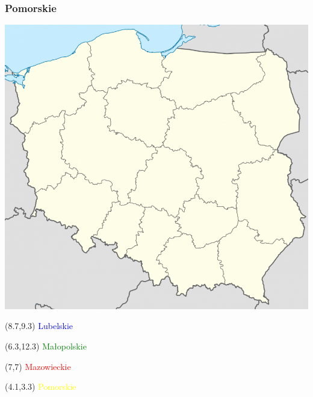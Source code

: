 \documentclass{beamer}
\begin{document}
\begin{frame}
\frametitle{Pomorskie}
\includegraphics[scale=0.25]{Polska}
\begin{textblock}{3}(8.7,9.3)
\textcolor{blue}{Lubelskie}
\end{textblock}
\begin{textblock}{3}(6.3,12.3)
\textcolor{green}{Małopolskie}
\end{textblock}
\begin{textblock}{3}(7,7)
\textcolor{red}{Mazowieckie}
\end{textblock}
\begin{textblock}{3}(4.1,3.3)
\textcolor{yellow}{Pomorskie}
\end{textblock}
\end{frame}
\end{document}
